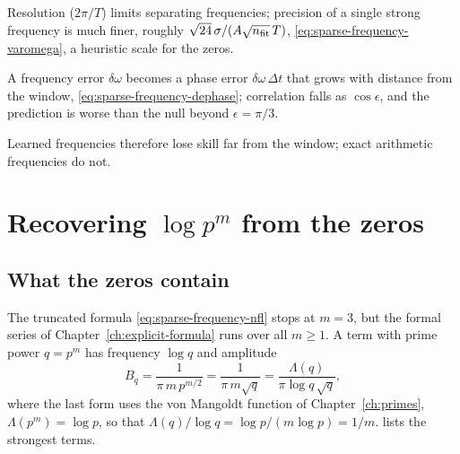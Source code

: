 \begin{keyideas}
\item Resolution ($2\pi/T$) limits separating frequencies; precision of a single strong frequency is much finer, roughly $\sqrt{24}\,\sigma/(A\sqrt{n_{\rm fit}}\,T)$, \eqref{eq:sparse-frequency-varomega}, a heuristic scale for the zeros.
\item A frequency error $\delta\omega$ becomes a phase error $\delta\omega\,\Delta t$ that grows with distance from the window, \eqref{eq:sparse-frequency-dephase}; correlation falls as $\cos\epsilon$, and the prediction is worse than the null beyond $\epsilon=\pi/3$.
\item Learned frequencies therefore lose skill far from the window; exact arithmetic frequencies do not.
\end{keyideas}

\section{Recovering $\log p^m$ from the zeros}\label{sec:sparse-frequency-primes}

\subsection{What the zeros contain}

The truncated formula \eqref{eq:sparse-frequency-nfl} stops at $m=3$, but the formal series of Chapter~\ref{ch:explicit-formula} runs over all $m\ge1$. A term with prime power $q=p^m$ has frequency $\log q$ and amplitude
\begin{equation}
B_q=\frac{1}{\pi\,m\,p^{m/2}}=\frac{1}{\pi\,m\sqrt q}=\frac{\Lambda(q)}{\pi\log q\,\sqrt q},
\label{eq:sparse-frequency-amp}
\end{equation}
where the last form uses the von Mangoldt function of Chapter~\ref{ch:primes}, $\Lambda(p^m)=\log p$, so that $\Lambda(q)/\log q=\log p/(m\log p)=1/m$.  lists the strongest terms.

